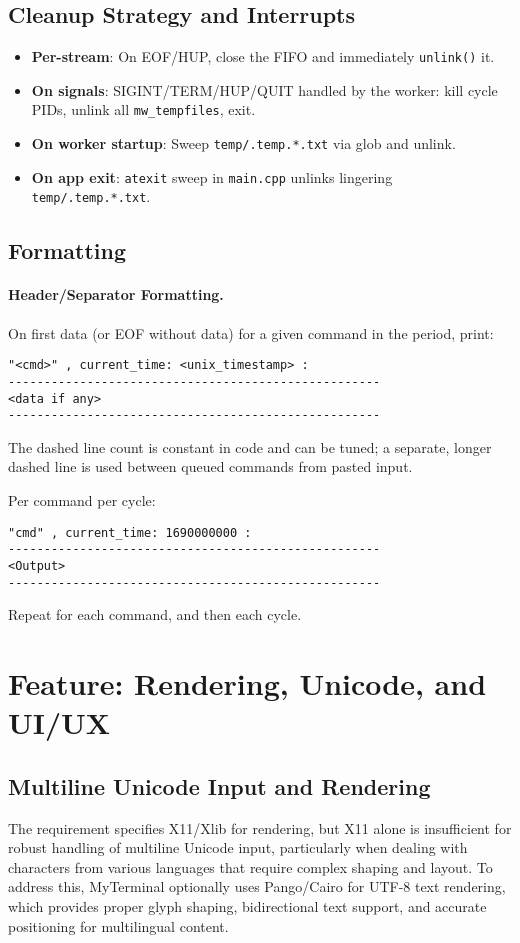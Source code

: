 \documentclass[11pt,a4paper]{article}
\begin{document}
\subsection{Cleanup Strategy and Interrupts}
\begin{itemize}[leftmargin=*]
  \item \textbf{Per-stream}: On EOF/HUP, close the FIFO and immediately \texttt{unlink()} it.
  \item \textbf{On signals}: SIGINT/TERM/HUP/QUIT handled by the worker: kill cycle PIDs, unlink all \texttt{mw\_tempfiles}, exit.
  \item \textbf{On worker startup}: Sweep \texttt{temp/.temp.*.txt} via glob and unlink.
  \item \textbf{On app exit}: \texttt{atexit} sweep in \texttt{main.cpp} unlinks lingering \texttt{temp/.temp.*.txt}.
\end{itemize}

\subsection{Formatting}
\paragraph{Header/Separator Formatting.}
On first data (or EOF without data) for a given command in the period, print:
\begin{lstlisting}[style=code]
"<cmd>" , current_time: <unix_timestamp> :
----------------------------------------------------
<data if any>
----------------------------------------------------
\end{lstlisting}
The dashed line count is constant in code and can be tuned; a separate, longer dashed line is used between queued commands from pasted input.

Per command per cycle:
\begin{lstlisting}[style=code]
"cmd" , current_time: 1690000000 :
----------------------------------------------------
<Output>
----------------------------------------------------
\end{lstlisting}
Repeat for each command, and then each cycle.

\section{Feature: Rendering, Unicode, and UI/UX}

\subsection{Multiline Unicode Input and Rendering}
The requirement specifies X11/Xlib for rendering, but X11 alone is insufficient for robust handling of multiline Unicode input, particularly when dealing with characters from various languages that require complex shaping and layout. To address this, MyTerminal optionally uses Pango/Cairo for UTF-8 text rendering, which provides proper glyph shaping, bidirectional text support, and accurate positioning for multilingual content.
\end{document}
